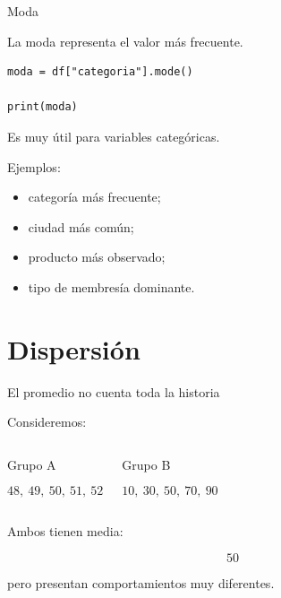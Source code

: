 \documentclass[aspectratio=169,11pt]{beamer}
\begin{document}
\begin{frame}[fragile]{Moda}

La moda representa el valor más frecuente.

\begin{lstlisting}
moda = df["categoria"].mode()

print(moda)
\end{lstlisting}

Es muy útil para variables categóricas.

Ejemplos:

\begin{itemize}

    \item categoría más frecuente;

    \item ciudad más común;

    \item producto más observado;

    \item tipo de membresía dominante.

\end{itemize}

\end{frame}

\section{Dispersión}

\begin{frame}{El promedio no cuenta toda la historia}

Consideremos:

\vspace{0.2cm}

\begin{columns}


\begin{block}{Grupo A}

\[
48,\ 49,\ 50,\ 51,\ 52
\]

\end{block}


\begin{exampleblock}{Grupo B}

\[
10,\ 30,\ 50,\ 70,\ 90
\]

\end{exampleblock}

\end{columns}

\vspace{0.5cm}

Ambos tienen media:

\[
50
\]

pero presentan comportamientos muy diferentes.

\end{frame}
\end{document}
